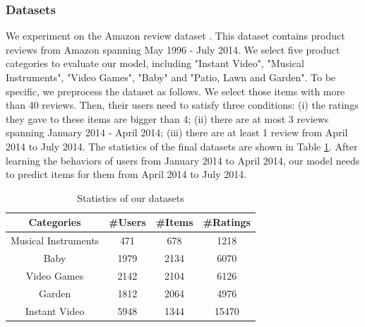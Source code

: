 \documentclass[runningheads]{llncs}
\begin{document}
\subsubsection{Datasets} 
We experiment on the Amazon review dataset \cite{he2016ups} \cite{mcauley2015image}. 
This dataset contains product reviews from Amazon spanning May 1996 - July 2014. 
We select five product categories to evaluate our model, including "Instant Video", "Musical Instruments", "Video Games", "Baby" and "Patio, Lawn and Garden".
To be specific, we preprocess the dataset as follows.
We select those items with more than 40 reviews. Then, their users need to satisfy three conditions: (i) the ratings they gave to these items are bigger than 4; (ii) there are at most 3 reviews spanning January 2014 - April 2014; (iii) there are at least 1 review from April 2014 to July 2014.
The statistics of the final datasets are shown in Table \ref{tab1}.
After learning the behaviors of users from January 2014 to April 2014, our model needs to predict items for them from April 2014 to July 2014.

\begin{table}[htbp]
\centering
\caption{Statistics of our datasets}
    \begin{tabular}{c|c|c|c}
    \hline
    \hline
    Categories & \#Users & \#Items & \#Ratings \\
    \midrule
    Musical Instruments & 471   & 678   & 1218 \\
    Baby  & 1979  & 2134  & 6070 \\
    Video Games & 2142  & 2104  & 6126 \\
    Garden & 1812  & 2064  & 4976 \\
    Instant Video & 5948  & 1344  & 15470 \\
    \hline
    \end{tabular}%
\label{tab1}%
\end{table}%
  
\end{document}
